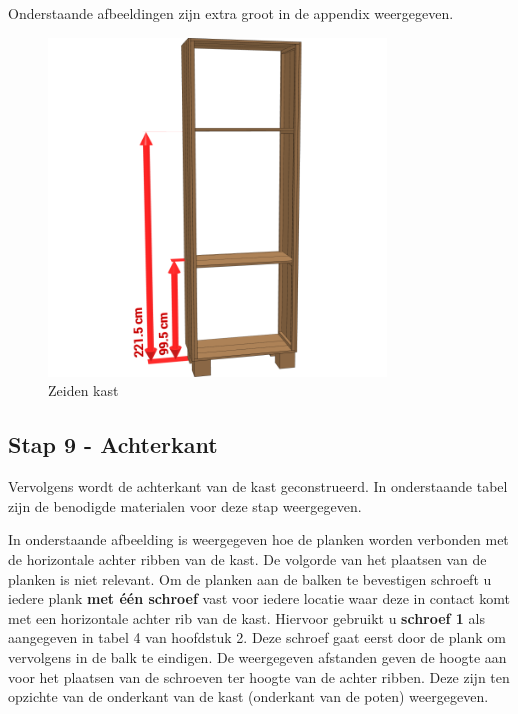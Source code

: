 \documentclass{article}
\begin{document}
Onderstaande afbeeldingen zijn extra groot in de appendix weergegeven.

\begin{figure}[h!]
    \centering
    \includegraphics[width=0.8\textwidth]{scene 8 - links_rechts.png}
    \caption{Zeiden kast}
    \label{fig:stap 8}
\end{figure}

\clearpage
\newpage

\subsection{Stap 9 - Achterkant}

Vervolgens wordt de achterkant van de kast geconstrueerd. In onderstaande tabel zijn de benodigde materialen voor deze stap weergegeven.



In onderstaande afbeelding is weergegeven hoe de planken worden verbonden met de horizontale achter ribben van de kast. De volgorde van het plaatsen van de planken is niet relevant. Om de planken aan de balken te bevestigen schroeft u iedere plank \textbf{met \'{e}\'{en} schroef} vast voor iedere locatie waar deze in contact komt met een horizontale achter rib van de kast. Hiervoor gebruikt u \textbf{schroef 1} als aangegeven in tabel 4 van hoofdstuk 2. Deze schroef gaat eerst door de plank om vervolgens in de balk te eindigen. De weergegeven afstanden geven de hoogte aan voor het plaatsen van de schroeven ter hoogte van de achter ribben. Deze zijn ten opzichte van de onderkant van de kast (onderkant van de poten) weergegeven.
\end{document}
